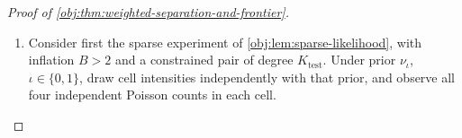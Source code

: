 \begin{proof}[Proof of \cref{obj:thm:weighted-separation-and-frontier}]
\begin{enumerate}
Here is the likelihood calibration used in both large-alphabet constructions. For integers \(K_{\mathrm{test}}\ge1\) and real \(\tau\ge0\), define
\[
\mathcal T_{K_{\mathrm{test}}}(\tau)
=\sum_{\ell>K_{\mathrm{test}}}\frac{\tau^\ell}{\ell!},
\qquad
\beta_{\mathrm{tail}}=\frac1{16e}.
\]
When \(\tau\le\beta_{\mathrm{tail}}K_{\mathrm{test}}\), the factorial bound
\(\ell!\ge(\ell/e)^\ell\) gives, for \(\ell>K_{\mathrm{test}}\),
\[
\frac{\tau^\ell}{\ell!}
\le\left(\frac{e\tau}{\ell}\right)^\ell
\le4^{-\ell}.
\]
Summing the geometric tail therefore gives
\[
\mathcal T_{K_{\mathrm{test}}}(\tau)
\le4^{-K_{\mathrm{test}}},
\qquad
\sqrt{\mathcal T_{K_{\mathrm{test}}}(\tau)}
\le2^{-K_{\mathrm{test}}}.
\]
Define
\[
C_{\mathrm{tv}}=\frac{|\log8|+2}{\log2}.
\]
If \(K_{\mathrm{test}}\ge C_{\mathrm{tv}}L_d\), then
\[
K_{\mathrm{test}}\log2
\ge(|\log8|+2)(1+\log d)
\ge\log(8d),
\]
and consequently
\[
d\sqrt{\mathcal T_{K_{\mathrm{test}}}(\tau)}
\le d\,2^{-K_{\mathrm{test}}}\le\frac18.
\]

\item
Consider first the sparse experiment of
\cref{obj:lem:sparse-likelihood}, with inflation \(B>2\) and a constrained pair of degree \(K_{\mathrm{test}}\). Under prior \(\nu_\iota\), \(\iota\in\{0,1\}\), draw cell intensities independently with that prior, and observe all four independent Poisson counts in each cell.


\end{enumerate}
\end{proof}
